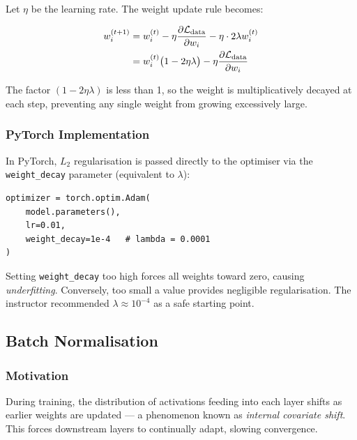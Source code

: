 \documentclass[12pt,a4paper]{article}
\newcommand{\Ltwo}{L_2}
\begin{document}
Let $\eta$ be the learning rate.  The weight update rule becomes:

\begin{align}
  \label{eq:l2_update}
  w_i^{(t+1)}
    &= w_i^{(t)} - \eta \frac{\partial \mathcal{L}_{\text{data}}}{\partial w_i}
       - \eta \cdot 2\lambda w_i^{(t)} \notag \\
    &= w_i^{(t)}\bigl(1 - 2\eta\lambda\bigr)
       - \eta \frac{\partial \mathcal{L}_{\text{data}}}{\partial w_i}
\end{align}

The factor $(1 - 2\eta\lambda)$ is less than 1, so the weight is
multiplicatively decayed at each step, preventing any single weight from
growing excessively large.

\subsubsection{PyTorch Implementation}
\label{sec:regularisation:l2:code}

In PyTorch, $\Ltwo$ regularisation is passed directly to the optimiser via
the \texttt{weight\_decay} parameter (equivalent to $\lambda$):

\begin{verbatim}
optimizer = torch.optim.Adam(
    model.parameters(),
    lr=0.01,
    weight_decay=1e-4   # lambda = 0.0001
)
\end{verbatim}

\begin{warningbox}
  Setting \texttt{weight\_decay} too high forces all weights toward zero,
  causing \emph{underfitting}.  Conversely, too small a value provides
  negligible regularisation.  The instructor recommended $\lambda \approx
  10^{-4}$ as a safe starting point.
\end{warningbox}

\subsection{Batch Normalisation}
\label{sec:regularisation:batchnorm}

\subsubsection{Motivation}
\label{sec:regularisation:batchnorm:motivation}

During training, the distribution of activations feeding into each layer
shifts as earlier weights are updated --- a phenomenon known as
\emph{internal covariate shift}.  This forces downstream layers to
continually adapt, slowing convergence.
\end{document}
